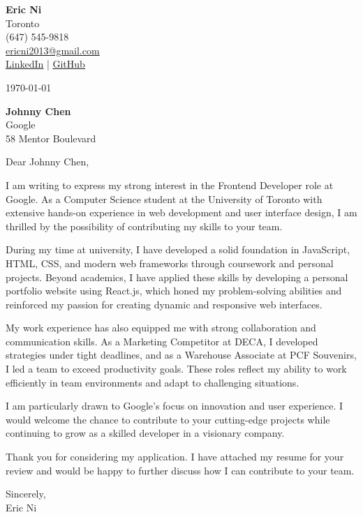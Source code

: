 \documentclass[10pt]{article}
\begin{document}
\noindent
\textbf{Eric Ni} \\
Toronto \\
(647) 545-9818 \\
\href{mailto:ericni2013@gmail.com}{\underline{ericni2013@gmail.com}} \\
\href{https://www.linkedin.com/in/eric-ni-017985225/}{\underline{LinkedIn}} | \href{https://github.com/ericnii}{\underline{GitHub}}

\vspace{1em}

\today

\vspace{1em}

\textbf{Johnny Chen} \\
Google \\
58 Mentor Boulevard

\vspace{1em}

Dear Johnny Chen,

I am writing to express my strong interest in the Frontend Developer role at Google. As a Computer Science student at the University of Toronto with extensive hands-on experience in web development and user interface design, I am thrilled by the possibility of contributing my skills to your team.

During my time at university, I have developed a solid foundation in JavaScript, HTML, CSS, and modern web frameworks through coursework and personal projects. Beyond academics, I have applied these skills by developing a personal portfolio website using React.js, which honed my problem-solving abilities and reinforced my passion for creating dynamic and responsive web interfaces.

My work experience has also equipped me with strong collaboration and communication skills. As a Marketing Competitor at DECA, I developed strategies under tight deadlines, and as a Warehouse Associate at PCF Souvenirs, I led a team to exceed productivity goals. These roles reflect my ability to work efficiently in team environments and adapt to challenging situations.

I am particularly drawn to Google's focus on innovation and user experience. I would welcome the chance to contribute to your cutting-edge projects while continuing to grow as a skilled developer in a visionary company.

Thank you for considering my application. I have attached my resume for your review and would be happy to further discuss how I can contribute to your team.

\vspace{1em}

Sincerely, \\
Eric Ni
\end{document}
